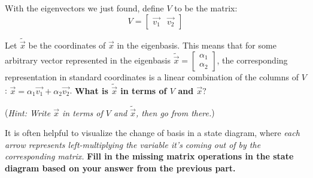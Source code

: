 With the eigenvectors we just found, define $V$ to be the matrix:
$$V = \begin{bmatrix}
\vec{v_1} & \vec{v_2}
\end{bmatrix}$$

\begin{enumerate}[resume]

\qitem Let $\widetilde{\vec{x}}$ be the coordinates of $\vec{x}$ in the eigenbasis. This means that for some arbitrary vector represented in the eigenbasis $\widetilde{\vec{x}} = \begin{bmatrix} \alpha_1 \\ \alpha_2 \end{bmatrix}$, the corresponding representation in standard coordinates is a linear combination of the columns of $V$: $\vec{x} = \alpha_1 \vec{v_1} + \alpha_2 \vec{v_2}$. \textbf{What is $\widetilde{\vec{x}}$ in terms of $V$ and $\vec{x}?$}

(\textit{Hint: Write $\vec{x}$ in terms of $V$ and $\tilde{\vec{x}}$, then go from there.})

\ws{\vspace{3em}}



\qitem It is often helpful to visualize the change of basis in a state diagram, where \textit{each arrow represents left-multiplying the variable it's coming out of by the corresponding matrix.} \textbf{Fill in the missing matrix operations in the state diagram based on your answer from the previous part.}



\end{enumerate}
